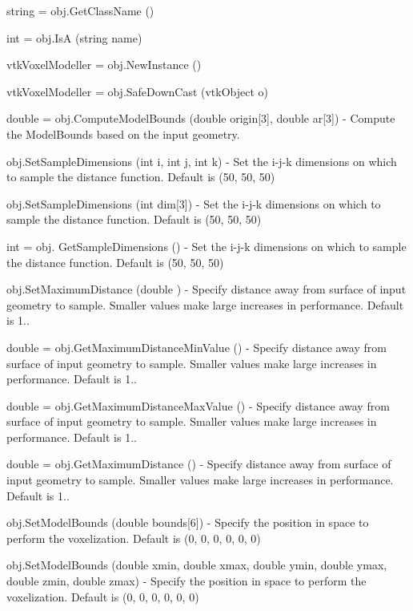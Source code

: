 \begin{DoxyItemize}
\item {\ttfamily string = obj.\-Get\-Class\-Name ()}  
\item {\ttfamily int = obj.\-Is\-A (string name)}  
\item {\ttfamily vtk\-Voxel\-Modeller = obj.\-New\-Instance ()}  
\item {\ttfamily vtk\-Voxel\-Modeller = obj.\-Safe\-Down\-Cast (vtk\-Object o)}  
\item {\ttfamily double = obj.\-Compute\-Model\-Bounds (double origin\mbox{[}3\mbox{]}, double ar\mbox{[}3\mbox{]})} -\/ Compute the Model\-Bounds based on the input geometry.  
\item {\ttfamily obj.\-Set\-Sample\-Dimensions (int i, int j, int k)} -\/ Set the i-\/j-\/k dimensions on which to sample the distance function. Default is (50, 50, 50)  
\item {\ttfamily obj.\-Set\-Sample\-Dimensions (int dim\mbox{[}3\mbox{]})} -\/ Set the i-\/j-\/k dimensions on which to sample the distance function. Default is (50, 50, 50)  
\item {\ttfamily int = obj. Get\-Sample\-Dimensions ()} -\/ Set the i-\/j-\/k dimensions on which to sample the distance function. Default is (50, 50, 50)  
\item {\ttfamily obj.\-Set\-Maximum\-Distance (double )} -\/ Specify distance away from surface of input geometry to sample. Smaller values make large increases in performance. Default is 1..  
\item {\ttfamily double = obj.\-Get\-Maximum\-Distance\-Min\-Value ()} -\/ Specify distance away from surface of input geometry to sample. Smaller values make large increases in performance. Default is 1..  
\item {\ttfamily double = obj.\-Get\-Maximum\-Distance\-Max\-Value ()} -\/ Specify distance away from surface of input geometry to sample. Smaller values make large increases in performance. Default is 1..  
\item {\ttfamily double = obj.\-Get\-Maximum\-Distance ()} -\/ Specify distance away from surface of input geometry to sample. Smaller values make large increases in performance. Default is 1..  
\item {\ttfamily obj.\-Set\-Model\-Bounds (double bounds\mbox{[}6\mbox{]})} -\/ Specify the position in space to perform the voxelization. Default is (0, 0, 0, 0, 0, 0)  
\item {\ttfamily obj.\-Set\-Model\-Bounds (double xmin, double xmax, double ymin, double ymax, double zmin, double zmax)} -\/ Specify the position in space to perform the voxelization. Default is (0, 0, 0, 0, 0, 0)  

\end{DoxyItemize}
